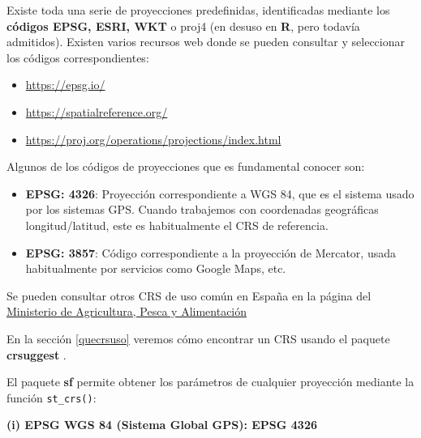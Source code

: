 \documentclass[
]{book}
\theoremstyle{definition}
\theoremstyle{definition}
\theoremstyle{definition}
\theoremstyle{definition}
\theoremstyle{remark}
\begin{document}
Existe toda una serie de proyecciones predefinidas, identificadas mediante los
\textbf{códigos EPSG, ESRI, WKT} o proj4 (en desuso en \textbf{R}, pero todavía
admitidos). Existen varios recursos web donde se pueden consultar y seleccionar
los códigos correspondientes:

\begin{itemize}
\item
  \url{https://epsg.io/}
\item
  \url{https://spatialreference.org/}
\item
  \url{https://proj.org/operations/projections/index.html}
\end{itemize}

Algunos de los códigos de proyecciones que es fundamental conocer son:

\begin{itemize}
\item
  \textbf{EPSG: 4326}: Proyección correspondiente a WGS 84, que es el sistema usado
  por los sistemas GPS. Cuando trabajemos con coordenadas geográficas
  longitud/latitud, este es habitualmente el CRS de referencia.
\item
  \textbf{EPSG: 3857}: Código correspondiente a la proyección de Mercator, usada
  habitualmente por servicios como Google Maps, etc.
\end{itemize}

Se pueden consultar otros CRS de uso común en España en la página del
\href{https://www.mapa.gob.es/es/cartografia-y-sig/ide/directorio_datos_servicios/caracteristicas_wms.aspx}{Ministerio de Agricultura, Pesca y
Alimentación}

En la sección \ref{quecrsuso} veremos cómo encontrar un CRS usando el paquete
\textbf{crsuggest} \citep{R-crsuggest}.

El paquete \textbf{sf} \citep{R-sf}permite obtener los parámetros de cualquier proyección
mediante la función \texttt{st\_crs()}:

\textbf{(i) EPSG WGS 84 (Sistema Global GPS): EPSG 4326}
\end{document}
